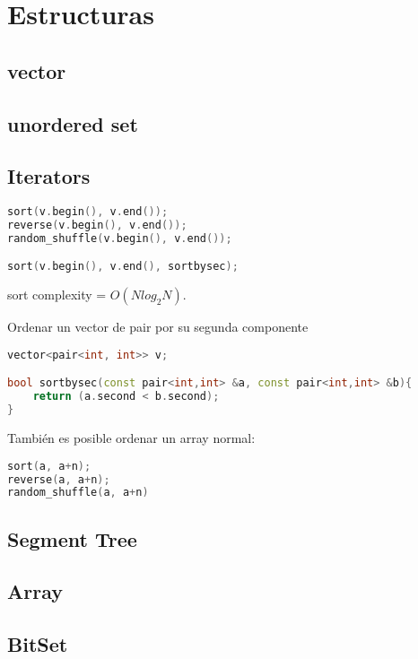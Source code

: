 \newpage
\section{Estructuras}

\subsection{vector}


\subsection{unordered set}


\subsection{Iterators}
\begin{lstlisting}[language=C++]
sort(v.begin(), v.end());
reverse(v.begin(), v.end());
random_shuffle(v.begin(), v.end());

sort(v.begin(), v.end(), sortbysec);
\end{lstlisting}

sort complexity = $O(N log_2 N)$.

Ordenar un vector de pair por su segunda componente
\begin{lstlisting}[language=C++]
vector<pair<int, int>> v;

bool sortbysec(const pair<int,int> &a, const pair<int,int> &b){
	return (a.second < b.second);
}
\end{lstlisting}

También es posible ordenar un array normal:
\begin{lstlisting}[language=C++]
sort(a, a+n);
reverse(a, a+n);
random_shuffle(a, a+n)
\end{lstlisting}

\subsection{Segment Tree}


\subsection{Array}

\subsection{BitSet}

\newpage
